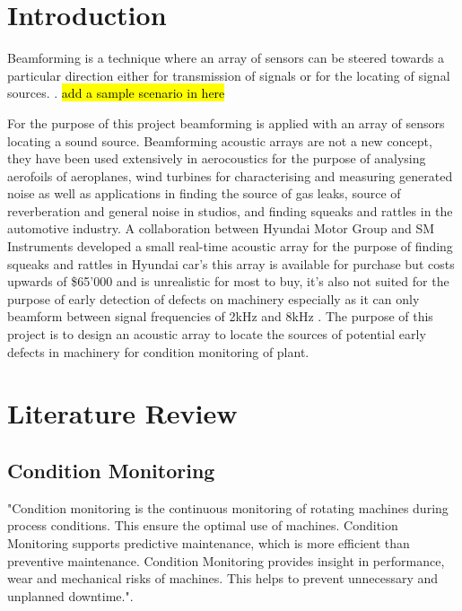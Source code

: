 \documentclass{UoNMCHA}
\numberwithin{equation}{section}
\begin{document}
\section{Introduction} \label{sec:Introduction}
    
    Beamforming is a technique where an array of sensors can be steered towards a particular direction either for transmission of signals or for the locating of signal sources. \citep{Sha18}. \hl{ add a sample scenario in here}
    
    For the purpose of this project beamforming is applied with an array of sensors locating a sound source. Beamforming acoustic arrays are not a new concept, they have been used extensively in aerocoustics for the purpose of analysing aerofoils of aeroplanes, wind turbines for characterising and measuring generated noise as well as applications in finding the source of gas leaks, source of reverberation and general noise in studios, and finding squeaks and rattles in the automotive industry. A collaboration between Hyundai Motor Group and SM Instruments developed a small real-time acoustic array for the purpose of finding squeaks and rattles in Hyundai car's this array is available for purchase but costs upwards of \$65'000 and is unrealistic for most to buy, it's also not suited for the purpose of early detection of defects on machinery especially as it can only beamform between signal frequencies of 2kHz and 8kHz \citep{Smi}. The purpose of this project is to design an acoustic array to locate the sources of potential early defects in machinery for condition monitoring of plant.
    
\newpage
\section{Literature Review} \label{sec:Literature Review}
\subsection{Condition Monitoring} \label{sec:Condition Monitoring}
    "Condition monitoring is the continuous monitoring of rotating machines during process conditions. This ensure the optimal use of machines. Condition Monitoring supports predictive maintenance, which is more efficient than preventive maintenance. Condition Monitoring provides insight in performance, wear and mechanical risks of machines. This helps to prevent unnecessary and unplanned downtime."\citep{Ist}.
    
\end{document}
